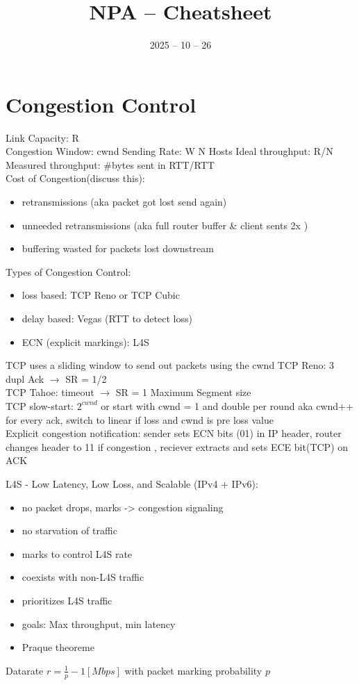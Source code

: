 \documentclass{article}
\date{2025 -- 10 -- 26}
\title{NPA -- Cheatsheet}
\begin{document}
    \section{Congestion Control}
    Link Capacity: R\\
    Congestion Window: cwnd 
    Sending Rate: W
    N Hosts
    Ideal throughput: R/N\\
    Measured throughput: \#bytes sent in RTT/RTT\\
    Cost of Congestion(discuss this):
    \begin{itemize}
        \item retransmissions (aka packet got lost send again)
        \item unneeded retransmissions (aka full router buffer \& client sents 2x  )
        \item buffering wasted for packets lost downstream
    \end{itemize}
    Types of Congestion Control:
    \begin{itemize}
        \item loss based: TCP Reno or TCP Cubic
        \item delay based: Vegas (RTT to detect loss)
        \item ECN (explicit markings): L4S
    \end{itemize}
    TCP uses a sliding window to send out packets using the cwnd
    TCP Reno: 3 dupl Ack $\rightarrow$ SR = 1/2\\
    TCP Tahoe: timeout $\rightarrow$  SR = 1 Maximum Segment size\\
    TCP slow-start: $2^{cwnd}$ or start with cwnd = 1 and double per round aka cwnd++ for every ack, switch to linear if loss and cwnd is pre loss value \\
    Explicit congestion notification: sender sets ECN bits (01) in IP header, router changes header to 11 if congestion , reciever extracts and sets ECE bit(TCP) on ACK 

    L4S - Low Latency, Low Loss, and Scalable (IPv4 + IPv6):
    \begin{itemize}
        \item no packet drops, marks -> congestion signaling
        \item  no starvation of traffic
        \item marks to control L4S rate
        \item coexists with non-L4S traffic
        \item prioritizes L4S traffic
        \item goals: Max throughput, min latency
        \item Praque theoreme
    \end{itemize}
    Datarate $r = \frac{1}{p}-1[Mbps]$ with packet marking probability $p$ 
\end{document}
